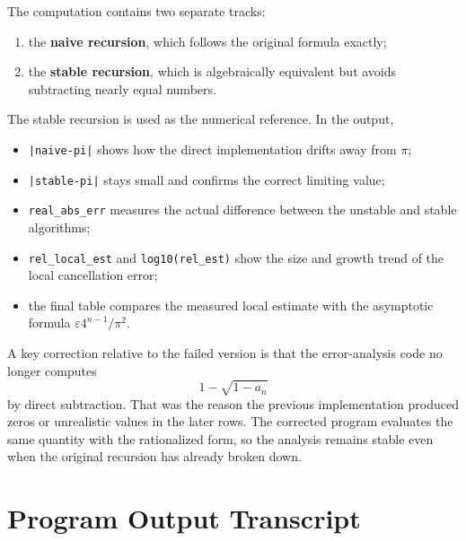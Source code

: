 \documentclass[12pt,a4paper]{article}
\begin{document}
The computation contains two separate tracks:
\begin{enumerate}[label=(\arabic*)]
    \item the \textbf{naive recursion}, which follows the original formula exactly;
    \item the \textbf{stable recursion}, which is algebraically equivalent but avoids subtracting nearly equal numbers.
\end{enumerate}

The stable recursion is used as the numerical reference. In the output,
\begin{itemize}
    \item \texttt{|naive-pi|} shows how the direct implementation drifts away from $\pi$;
    \item \texttt{|stable-pi|} stays small and confirms the correct limiting value;
    \item \texttt{real\_abs\_err} measures the actual difference between the unstable and stable algorithms;
    \item \texttt{rel\_local\_est} and \texttt{log10(rel\_est)} show the size and growth trend of the local cancellation error;
    \item the final table compares the measured local estimate with the asymptotic formula $\varepsilon 4^{n-1}/\pi^2$.
\end{itemize}

A key correction relative to the failed version is that the error-analysis code no longer computes
\[
1 - \sqrt{1-a_n}
\]
by direct subtraction. That was the reason the previous implementation produced zeros or unrealistic values in the later rows. The corrected program evaluates the same quantity with the rationalized form, so the analysis remains stable even when the original recursion has already broken down.

\section{Program Output Transcript}
\end{document}
